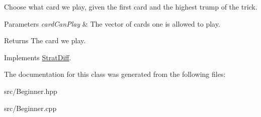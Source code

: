 Choose what card we play, given the first card and the highest trump of the trick. 


\begin{DoxyParams}{Parameters}
{\em card\-Can\-Play} & The vector of cards one is allowed to play. \\
\hline
\end{DoxyParams}
\begin{DoxyReturn}{Returns}
The card we play. 
\end{DoxyReturn}


Implements \hyperlink{classStratDiff_a550903bf95e6a897f346debab972f33a}{Strat\-Diff}.



The documentation for this class was generated from the following files\-:\begin{DoxyCompactItemize}
\item 
src/Beginner.\-hpp\item 
src/Beginner.\-cpp\end{DoxyCompactItemize}
